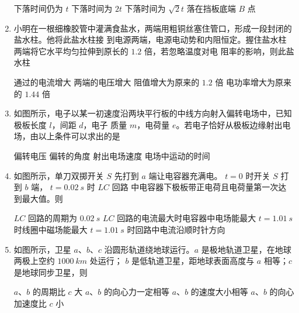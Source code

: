 \begin{enumerate}
\fourchoices
{下落时间仍为 $ t $}
{下落时间为 $ 2t $}
{下落时间为 $ \sqrt{2} t $}
{落在挡板底端 $ B $ 点}



\item
小明在一根细橡胶管中灌满食盐水，两端用粗铜丝塞住管口，形成一段封闭的盐水柱。他将此盐水柱接
到电源两端，电源电动势和内阻恒定。握住盐水柱两端将它水平均匀拉伸到原长的 $ 1.2 $ 倍，若忽略温度对电
阻率的影响，则此盐水柱  


\fourchoices
{通过的电流增大}
{两端的电压增大}
{阻值增大为原来的 $ 1.2 $ 倍}
{电功率增大为原来的 $ 1.44 $ 倍}


\item
如图所示，电子以某一初速度沿两块平行板的中线方向射入偏转电场中，已知极板长度 $ l $，间距 $ d $，电子
质量 $ m $，电荷量 $ e $。若电子恰好从极板边缘射出电场，由以上条件可以求出的是  
\begin{figure}[h!]
\centering

\end{figure}


\fourchoices
{偏转电压}
{偏转的角度}
{射出电场速度}
{电场中运动的时间}


\item
如图所示，单刀双掷开关 $ S $ 先打到 $ a $ 端让电容器充满电。 $ t=0 $ 时开关 $ S $ 打到 $ b $ 端， $ t=0.02 \ s $ 时 $ LC $ 回路
中电容器下极板带正电荷且电荷量第一次达到最大值。则  
\begin{figure}[h!]
\centering

\end{figure}



\fourchoices
{$ LC $ 回路的周期为 $ 0.02 \ s $}
{$ LC $ 回路的电流最大时电容器中电场能最大}
{$ t=1.01 \ s $ 时线圈中磁场能最大}
{$ t=1.01 \ s $ 时回路中电流沿顺时针方向}


\item
如图所示，卫星 $ a $、$ b $、$ c $ 沿圆形轨道绕地球运行。$ a $ 是极地轨道卫星，在地球两极上空约 $ 1000 \ km $ 处运行；
$ b $ 是低轨道卫星，距地球表面高度与 $ a $ 相等；$ c $ 是地球同步卫星，则  
\begin{figure}[h!]
\centering

\end{figure}


\fourchoices
{$ a $、$ b $ 的周期比 $ c $ 大}
{$ a $、$ b $ 的向心力一定相等}
{$ a $、$ b $ 的速度大小相等}
{$ a $、$ b $ 的向心加速度比 $ c $ 小}



\end{enumerate}
